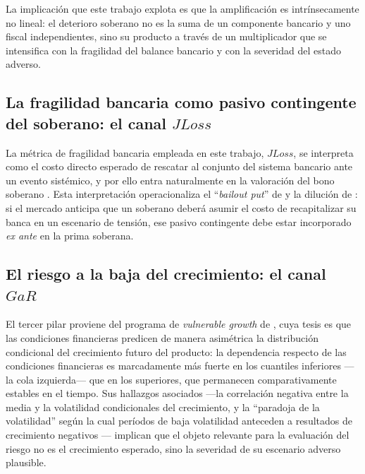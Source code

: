 La implicación que este trabajo explota es que la amplificación es intrínsecamente no lineal: el deterioro soberano no es la suma de un componente bancario y uno fiscal independientes, sino su producto a través de un multiplicador que se intensifica con la fragilidad del balance bancario y con la severidad del estado adverso.

\subsection{La fragilidad bancaria como pasivo contingente del soberano: el canal \texorpdfstring{$JLoss$}{JLoss}}

La métrica de fragilidad bancaria empleada en este trabajo, $JLoss$, se interpreta como el costo directo esperado de rescatar al conjunto del sistema bancario ante un evento sistémico, y por ello entra naturalmente en la valoración del bono soberano \citep{Chari2024b}. Esta interpretación operacionaliza el ``\textit{bailout put}'' de \citet{FarhiTirole2018b} y la dilución de \citet{AcharyaDrechslerSchnabl2014b}: si el mercado anticipa que un soberano deberá asumir el costo de recapitalizar su banca en un escenario de tensión, ese pasivo contingente debe estar incorporado \textit{ex ante} en la prima soberana.

\subsection{El riesgo a la baja del crecimiento: el canal \texorpdfstring{$GaR$}{GaR}}

El tercer pilar proviene del programa de \textit{vulnerable growth} de \citet{ABG2019b}, cuya tesis es que las condiciones financieras predicen de manera asimétrica la distribución condicional del crecimiento futuro del producto: la dependencia respecto de las condiciones financieras es marcadamente más fuerte en los cuantiles inferiores —la cola izquierda— que en los superiores, que permanecen comparativamente estables en el tiempo. Sus hallazgos asociados —la correlación negativa entre la media y la volatilidad condicionales del crecimiento, y la ``paradoja de la volatilidad'' según la cual períodos de baja volatilidad anteceden a resultados de crecimiento negativos \citep{BrunnermeierSannikov2014,AdrianBoyarchenko2012}— implican que el objeto relevante para la evaluación del riesgo no es el crecimiento esperado, sino la severidad de su escenario adverso plausible.

